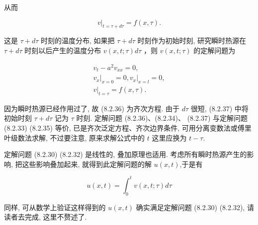 从而

$$
\left.v\right|_{t=\tau+d \tau}=f(x, \tau) .
$$

这是 $\tau+d \tau$ 时刻的温度分布, 如果把 $\tau+d \tau$ 时刻作为初始时刻, 研究瞬时热源在 $\tau+d \tau$ 时刻以后产生的温度分布 $v(x, t ; \tau) d \tau$ ，则 $v(x, t ; \tau)$ 的定解问题为

$$
\begin{gathered}
v_{t}-a^{2} v_{x x}=0, \\
\left.v_{x}\right|_{x=0}=0,\left.v_{x}\right|_{x=l}=0, \\
\left.v\right|_{t=\tau}=f(x, \tau) .
\end{gathered}
$$

因为瞬时热源已经作用过了, 故 (8.2.36) 为齐次方程. 由于 $d \tau$ 很短, (8.2.37) 中将初始时刻 $\tau+d \tau$ 记为 $\tau$ 时刻. 定解问题 (8.2.36)、(8.2.34)、 (8.2.37) 与定解问题 (8.2.33) (8.2.35) 等价, 已是齐次泛定方程、齐次边界条件, 可用分离变数法或傅里叶级数法求解, 不过要注意, 原来求解公式中的 $t$ 这里应换为 $t-\tau$.

定解问题 (8.2.30) (8.2.32) 是线性的, 叠加原理也适用. 考虑所有瞬时热源产生的影响, 把这些影响叠加起来, 就得到此定解问题的解 $u(x, t)$,于是有

$$
u(x, t)=\int_{0}^{t} v(x, t ; \tau) d \tau
$$

同样, 可从数学上验证这样得到的 $u(x, t)$ 确实满足定解问题 (8.2.30) (8.2.32), 请读者去完成, 这里不赘述了.
